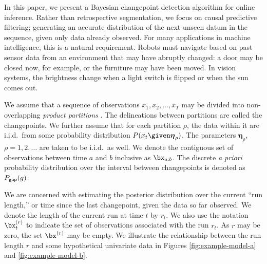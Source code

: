 \documentclass[]{article}
\newcommand{\boldeta}{\ensuremath{\boldsymbol{\eta}}}
\begin{document}
    In this paper, we present a Bayesian changepoint detection algorithm
    for online inference.  Rather than retrospective segmentation, we focus
    on causal predictive filtering; generating an accurate distribution of
    the next unseen datum in the sequence, given only data already
    observed.  For many applications in machine intelligence, this is a
    natural requirement.  Robots must navigate based on past sensor data
    from an environment that may have abruptly changed: a door may be
    closed now, for example, or the furniture may have been moved.  In
    vision systems, the brightness change when a light switch is flipped or
    when the sun comes out.

    We assume that a sequence of observations $x_{1},x_{2},\ldots,x_{T}$
    may be divided into non-overlapping \textit{product partitions}
    \cite{barry-hartigan-1992a}.  The delineations between partitions are
    called the changepoints.  We further assume that for each partition
    $\rho$, the data within it are i.i.d.\ from some probability
    distribution $P(x_{t} \given \boldeta_{\rho})$.  The parameters
    $\boldeta_{\rho}$, $\rho = 1,2,\ldots$ are taken to be i.i.d.\ as well.
    We denote the contiguous set of observations between time $a$ and $b$
    inclusive as $\bx_{a:b}$.  The discrete \textit{a priori} probability
    distribution over the interval between changepoints is denoted as
    $P_{\sf{gap}}(g)$.

    We are concerned with estimating the posterior distribution over the
    current ``run length,'' or time since the last changepoint, given the
    data so far observed.  We denote the length of the current run at time
    $t$ by $r_{t}$.  We also use the notation $\bx_{t}^{(r)}$ to indicate
    the set of observations associated with the run $r_{t}$.  As $r$ may be
    zero, the set $\bx^{(r)}$ may be empty.  We illustrate the relationship
    between the run length $r$ and some hypothetical univariate data in
    Figures \ref{fig:example-model-a} and \ref{fig:example-model-b}.
\end{document}
